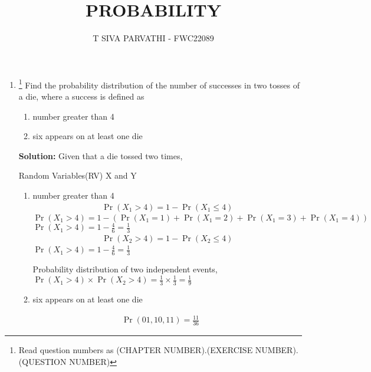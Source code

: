 \documentclass{article}
\providecommand{\pr}[1]{\ensuremath{\Pr\left(#1\right)}}
\newcommand{\solution}{\noindent \textbf{Solution: }}
\begin{document}
\title{PROBABILITY}
\author{\Large T SIVA PARVATHI - FWC22089}
\date{}

\maketitle
\begin{enumerate}[label=13.\arabic{enumi}.\arabic{enumii}]%
\setcounter{enumi}{3}
\setcounter{enumii}{5}

\item \footnote{Read question numbers as (CHAPTER NUMBER).(EXERCISE NUMBER).(QUESTION NUMBER)}
Find the probability distribution of the number of successes in two tosses of a die, where a success is defined as
\begin{enumerate}
\item number greater than 4
\item six appears on at least one die
\end{enumerate}

\solution
Given that a die tossed two times,
\begin{table}[h]\centering
	
	 \caption{Random Variables(RV) X and Y}\label{table:1}
\end{table}

\begin{enumerate}
\item number greater than 4
\begin{align}
\pr{X_1>4}=1-\pr{X_1\le4}
\end{align}
$\pr{X_1>4}=1-(\pr{X_1=1}+\pr{X_1=2}+\pr{X_1=3}+\pr{X_1=4})$\\
$\pr{X_1>4}=1-\frac{4}{6}=\frac{1}{3}$
\begin{align}
\pr{X_2>4}=1-\pr{X_2\le4}    
\end{align}
$\pr{X_1>4}=1-\frac{4}{6}=\frac{1}{3}$

Probability distribution of two independent events,
$\pr{X_1>4} \times \pr{X_2>4} = \frac{1}{3} \times \frac{1}{3}=\frac{1}{9}$
\item six appears on at least one die
\end{enumerate}
\begin{align}
\pr{01,10,11}=\frac{11}{36}
\end{align}
\end{enumerate}
\end{document}
